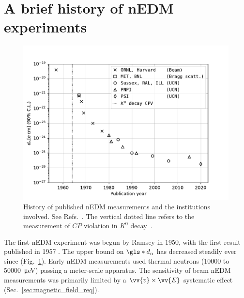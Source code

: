 

\section{A brief history of nEDM experiments}\label{sec:history_nedm}


\begin{figure}[htp]
    \centering
    \includegraphics[width=0.85 \textwidth]{figures/nEDM-history.pdf}
    \caption[History of published nEDM measurements and the institutions involved.]{History of published nEDM measurements and the institutions involved. See Refs.~\cite{ramsey_nedm_1950, ramsey_nedm_1957, miller_nedm_1967, shull_nedm_1967, dress_nedm_1968, cohen_nedm_1969, dress_nedm_1973, dress_nedm_1977, altarev_nedm_1980, altarev_nedm_1981, pendlebury_nedm_1984,
    altarev_nedm_1986, smith_nedm_1990, altarev_nedm_1992, altarev_nedm_1996, harris_nedm_1999, BAK06, ABE20, pnpi_nedm_2015}. The vertical dotted line refers to the measurement of $CP$ violation in $K^0$ decay~\cite{christenson_1964}.}
    \label{fig:nEDM-history}
\end{figure}

The first nEDM experiment was begun by Ramsey in 1950, with the first result published in 1957 \cite{ramsey_nedm_1950, ramsey_nedm_1957}. The upper bound on $\gls*{d_n}$ has decreased steadily ever since (Fig.~\ref{fig:nEDM-history}). Early nEDM measurements \cite{miller_nedm_1967, baird_nedm_1969, cohen_nedm_1969, dress_nedm_1977} used thermal neutrons (\num{10000} to \qty{50000}{\micro \eV}) passing a meter-scale apparatus. The sensitivity of beam nEDM measurements was primarily limited by a $\vv{v}\times\vv{E}$ systematic effect (Sec.~\ref{sec:magnetic_field_req}).

